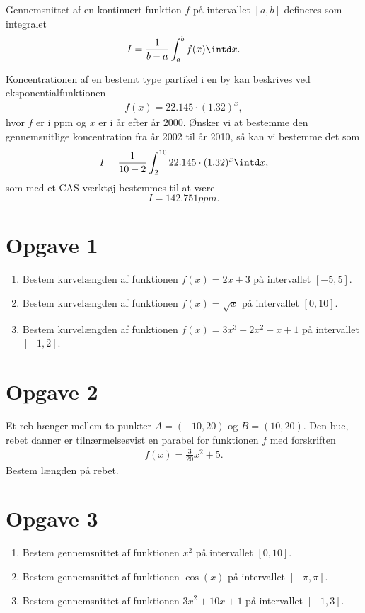 \begin{defn}
Gennemsnittet af en kontinuert funktion $f$ på intervallet $[a,b]$ defineres som integralet
\begin{align*}
I = \frac{1}{b-a}\int_a^bf(x)\intd x.
\end{align*}
\end{defn}

\begin{exa}
Koncentrationen af en bestemt type partikel i en by kan beskrives ved eksponentialfunktionen
\begin{align*}
f(x) = 22.145\cdot (1.32)^x,
\end{align*}
hvor $f$ er i ppm og $x$ er i år efter år 2000. Ønsker vi at bestemme den gennemsnitlige koncentration fra år 2002 til år 2010, så kan vi bestemme det som
\begin{align*}
I = \frac{1}{10-2}\int_2^{10}22.145\cdot (1.32)^x \intd x, 
\end{align*}
som med et CAS-værktøj bestemmes til at være
$$I = 142.751 ppm.$$
\end{exa}

\section*{Opgave 1}
\begin{enumerate}[label=\roman*)]
\item Bestem kurvelængden af funktionen $f(x) = 2x+3$ på intervallet $[-5,5]$.
\item Bestem kurvelængden af funktionen $f(x) = \sqrt{x}$ på intervallet $[0,10]$.
\item Bestem kurvelængden af funktionen $f(x) = 3x^3+2x^2+x+1$ på intervallet $[-1,2]$.
\end{enumerate}

\section*{Opgave 2}
Et reb hænger mellem to punkter $A = (-10,20)$ og $B = (10,20)$. Den bue, rebet danner er tilnærmelsesvist en parabel for funktionen $f$ med forskriften
\begin{align*}
f(x) = \frac{3}{20}x^2+5.
\end{align*}
Bestem længden på rebet. 


\section*{Opgave 3}
\begin{enumerate}[label=\roman*)]
\item Bestem gennemsnittet af funktionen $x^2$ på intervallet $[0,10]$.
\item Bestem gennemsnittet af funktionen $\cos(x)$ på intervallet $[-\pi,\pi]$. 
\item Bestem gennemsnittet af funktionen $3x^2+10x+1$ på intervallet $[-1,3]$. 
\end{enumerate}

